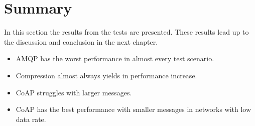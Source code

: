 \section{Summary}

In this section the results from the tests are presented. These results lead up
to the discussion and conclusion in the next chapter.

\begin{itemize}
\item AMQP has the worst performance in almost every test scenario.
\item Compression almost always yields in performance increase.
\item CoAP struggles with larger messages.
\item CoAP has the best performance with smaller messages in networks with low data rate.
\end{itemize}

